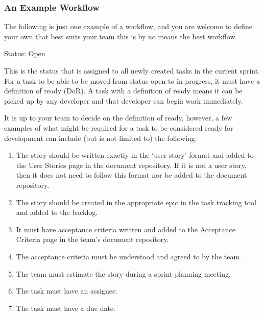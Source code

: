 \documentclass[letterpaper,10pt,english]{jupyterBook}
\begin{document}
\subsubsection{An Example Workflow}
\label{\detokenize{chapter_3/task_tracking:an-example-workflow}}
\sphinxAtStartPar
The following is just one example of a workflow, and you are welcome to
define your own that best suits your team \sphinxhyphen{} this is by no means the best
workflow.

\sphinxAtStartPar
{}

\sphinxAtStartPar
{} 

\sphinxAtStartPar
Status: Open

\sphinxAtStartPar
This is the status that is assigned to all newly created tasks in the
current sprint. For a task to be able to be moved from status open to in
progress, it must have a definition of ready (DoR). A task with a
definition of ready means it can be picked up by any developer and that
developer can begin work immediately.

\sphinxAtStartPar
It is up to your team to decide on the definition of ready, however, a
few examples of what might be required for a task to be considered ready
for development can include (but is not limited to) the following:
\begin{enumerate}
%
\item {} 
\sphinxAtStartPar
The story should be written exactly in the ‘user story’ format and
added to the User Stories page in the document repository. If it is
not a user story, then it does not need to follow this format nor be
added to the document repository.

\item {} 
\sphinxAtStartPar
The story should be created in the appropriate epic in the task
tracking tool and added to the backlog.

\item {} 
\sphinxAtStartPar
It must have acceptance criteria written and added to the Acceptance
Criteria page in the team’s document repository.

\item {} 
\sphinxAtStartPar
The acceptance criteria must be understood and agreed to by the team
.

\item {} 
\sphinxAtStartPar
The team must estimate the story during a sprint planning meeting.

\item {} 
\sphinxAtStartPar
The task must have an assignee.

\item {} 
\sphinxAtStartPar
The task must have a due date.

\end{enumerate}
\end{document}
